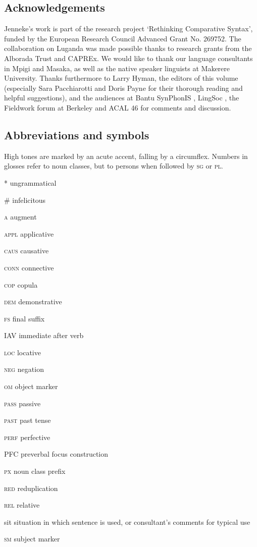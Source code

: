 \documentclass[output=paper]{langsci/langscibook}
\begin{document}
\subsection{Acknowledgements}

Jenneke’s work is part of the research project ‘Rethinking Comparative Syntax’, funded by the European Research Council Advanced Grant No. 269752. The collaboration on Luganda was made possible thanks to research grants from the Alborada Trust and CAPREx. We would like to thank our language consultants in Mpigi and Masaka, as well as the native speaker linguists at Makerere University. Thanks furthermore to Larry Hyman, the editors of this volume (especially Sara Pacchiarotti and Doris Payne for their thorough reading and helpful suggestions), and the audiences at Bantu SynPhonIS \citep{November2014}, LingSoc \citep{February2015}, the Fieldwork forum at Berkeley \citep{February2015} and ACAL 46 \citep{March2015} for comments and discussion.

\subsection{Abbreviations and symbols}

High tones are marked by an acute accent, falling by a circumflex. Numbers in glosses refer to noun classes, but to persons when followed by \textsc{sg} or \textsc{pl}.

*  ungrammatical

\#  infelicitous

\textsc{a}  augment

\textsc{appl}  applicative

\textsc{caus}  causative

\textsc{conn}  connective

\textsc{cop}  copula

\textsc{dem}  demonstrative

\textsc{fs}  final suffix

IAV  immediate after verb

\textsc{loc}  locative

\textsc{neg}  negation

\textsc{om}  object marker

\textsc{pass}  passive

\textsc{past}  past tense

\textsc{perf}  perfective

PFC  preverbal focus construction

\textsc{px}  noun class prefix

\textsc{red}  reduplication

\textsc{rel}  relative

sit  situation in which sentence is used, or consultant’s comments for typical use

\textsc{sm}  subject marker

  

\printbibliography[heading=subbibliography,notkeyword=this]
\end{document}
